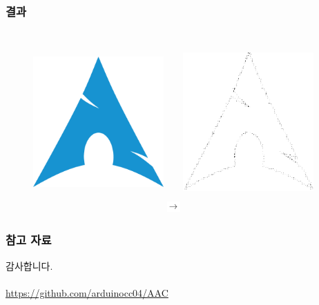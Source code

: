 \documentclass{beamer}
\begin{document}
	\begin{frame}{}
		\frametitle{결과}
		\begin{figure}
			\centering
			\includegraphics[align=c, width=5cm, height=7cm]{Input.png}
			\includegraphics[align=c, width=0.5cm, height=0.5cm]{Rightarrow.png}
			\includegraphics[align=c, width=5cm, height=7cm]{StructureBasedOutput.pdf}
		\end{figure}
	\end{frame}
	\begin{frame}{}
		\frametitle{참고 자료}
		
		\tiny{}
	\end{frame}
	\begin{frame}
		\centering
		감사합니다. \\~\\
		{\huge \href{https://github.com/arduinocc04/AAC}{https://github.com/arduinocc04/AAC}}
	\end{frame}
\end{document}

